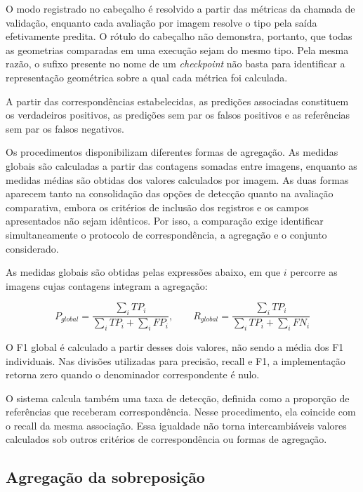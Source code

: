 O modo registrado no cabe\c{c}alho \'e resolvido a partir das m\'etricas da chamada de valida\c{c}\~ao, enquanto cada avalia\c{c}\~ao por imagem resolve o tipo pela sa\'ida efetivamente predita. O r\'otulo do cabe\c{c}alho n\~ao demonstra, portanto, que todas as geometrias comparadas em uma execu\c{c}\~ao sejam do mesmo tipo. Pela mesma raz\~ao, o sufixo presente no nome de um \textit{checkpoint} n\~ao basta para identificar a representa\c{c}\~ao geom\'etrica sobre a qual cada m\'etrica foi calculada.

A partir das correspond\^encias estabelecidas, as predi\c{c}\~oes associadas constituem os verdadeiros positivos, as predi\c{c}\~oes sem par os falsos positivos e as refer\^encias sem par os falsos negativos.

Os procedimentos disponibilizam diferentes formas de agrega\c{c}\~ao. As medidas globais s\~ao calculadas a partir das contagens somadas entre imagens, enquanto as medidas m\'edias s\~ao obtidas dos valores calculados por imagem. As duas formas aparecem tanto na consolida\c{c}\~ao das op\c{c}\~oes de detec\c{c}\~ao quanto na avalia\c{c}\~ao comparativa, embora os crit\'erios de inclus\~ao dos registros e os campos apresentados n\~ao sejam id\^enticos. Por isso, a compara\c{c}\~ao exige identificar simultaneamente o protocolo de correspond\^encia, a agrega\c{c}\~ao e o conjunto considerado.

As medidas globais s\~ao obtidas pelas express\~oes abaixo, em que $i$ percorre as imagens cujas contagens integram a agrega\c{c}\~ao:

\begin{equation}
  P_{global} = \frac{\sum_i TP_i}{\sum_i TP_i + \sum_i FP_i}, \qquad
  R_{global} = \frac{\sum_i TP_i}{\sum_i TP_i + \sum_i FN_i}
  \label{eq:p-r-global}
\end{equation}

O F1 global \'e calculado a partir desses dois valores, n\~ao sendo a m\'edia dos F1 individuais. Nas divis\~oes utilizadas para precis\~ao, recall e F1, a implementa\c{c}\~ao retorna zero quando o denominador correspondente \'e nulo.

O sistema calcula tamb\'em uma taxa de detec\c{c}\~ao, definida como a propor\c{c}\~ao de refer\^encias que receberam correspond\^encia. Nesse procedimento, ela coincide com o recall da mesma associa\c{c}\~ao. Essa igualdade n\~ao torna intercambi\'aveis valores calculados sob outros crit\'erios de correspond\^encia ou formas de agrega\c{c}\~ao.

\subsection{Agrega\c{c}\~ao da sobreposi\c{c}\~ao}
\label{sec:agregacao-sobreposicao}

